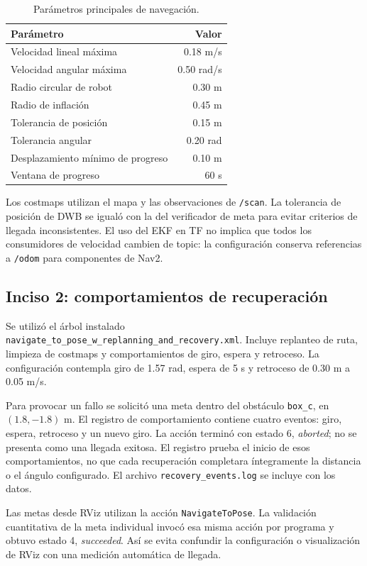 \documentclass[11pt,a4paper]{article}
\newcommand{\archivo}[1]{\nolinkurl{#1}}
\begin{document}
\begin{table}[H]\centering\caption{Parámetros principales de navegación.}
\begin{tabular}{lr}\toprule
Parámetro & Valor\\\midrule
Velocidad lineal máxima & 0.18 m/s\\
Velocidad angular máxima & 0.50 rad/s\\
Radio circular de robot & 0.30 m\\
Radio de inflación & 0.45 m\\
Tolerancia de posición & 0.15 m\\
Tolerancia angular & 0.20 rad\\
Desplazamiento mínimo de progreso & 0.10 m\\
Ventana de progreso & 60 s\\\bottomrule
\end{tabular}\end{table}
Los costmaps utilizan el mapa y las observaciones de \archivo{/scan}. La tolerancia de posición de DWB se igualó con la del verificador de meta para evitar criterios de llegada inconsistentes. El uso del EKF en TF no implica que todos los consumidores de velocidad cambien de topic: la configuración conserva referencias a \archivo{/odom} para componentes de Nav2.

\subsection{Inciso 2: comportamientos de recuperación}
Se utilizó el árbol instalado \archivo{navigate_to_pose_w_replanning_and_recovery.xml}. Incluye replanteo de ruta, limpieza de costmaps y comportamientos de giro, espera y retroceso. La configuración contempla giro de 1.57 rad, espera de 5 s y retroceso de 0.30 m a 0.05 m/s.

Para provocar un fallo se solicitó una meta dentro del obstáculo \archivo{box_c}, en $(1.8,-1.8)$ m. El registro de comportamiento contiene cuatro eventos: giro, espera, retroceso y un nuevo giro. La acción terminó con estado 6, \emph{aborted}; no se presenta como una llegada exitosa. El registro prueba el inicio de esos comportamientos, no que cada recuperación completara íntegramente la distancia o el ángulo configurado. El archivo \archivo{recovery_events.log} se incluye con los datos.

Las metas desde RViz utilizan la acción \archivo{NavigateToPose}. La validación cuantitativa de la meta individual invocó esa misma acción por programa y obtuvo estado 4, \emph{succeeded}. Así se evita confundir la configuración o visualización de RViz con una medición automática de llegada.
\end{document}
